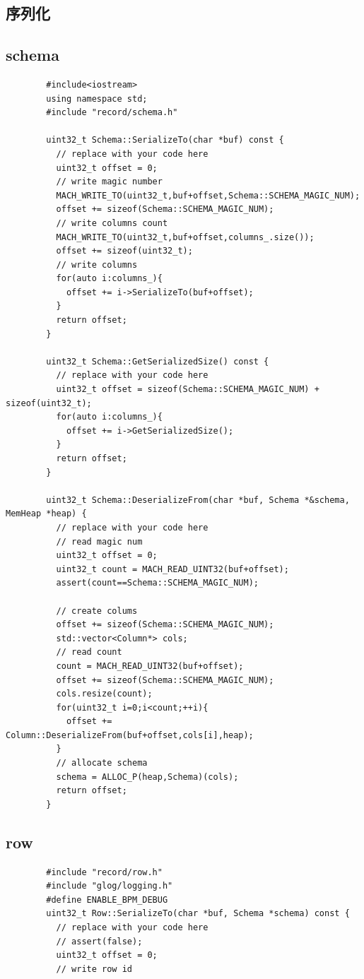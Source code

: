\documentclass{article}
\begin{document}
\begin{appendices}
    \section[A]{序列化}
    \subsection[1]{schema}
    \begin{lstlisting}
        #include<iostream>
        using namespace std;
        #include "record/schema.h"

        uint32_t Schema::SerializeTo(char *buf) const {
          // replace with your code here
          uint32_t offset = 0;
          // write magic number
          MACH_WRITE_TO(uint32_t,buf+offset,Schema::SCHEMA_MAGIC_NUM);
          offset += sizeof(Schema::SCHEMA_MAGIC_NUM);
          // write columns count
          MACH_WRITE_TO(uint32_t,buf+offset,columns_.size());
          offset += sizeof(uint32_t);
          // write columns
          for(auto i:columns_){
            offset += i->SerializeTo(buf+offset);
          }
          return offset;
        }
        
        uint32_t Schema::GetSerializedSize() const {
          // replace with your code here
          uint32_t offset = sizeof(Schema::SCHEMA_MAGIC_NUM) + sizeof(uint32_t);
          for(auto i:columns_){
            offset += i->GetSerializedSize();
          }
          return offset;
        }
        
        uint32_t Schema::DeserializeFrom(char *buf, Schema *&schema, MemHeap *heap) {
          // replace with your code here
          // read magic num
          uint32_t offset = 0;
          uint32_t count = MACH_READ_UINT32(buf+offset);
          assert(count==Schema::SCHEMA_MAGIC_NUM);
        
          // create colums
          offset += sizeof(Schema::SCHEMA_MAGIC_NUM);
          std::vector<Column*> cols;
          // read count
          count = MACH_READ_UINT32(buf+offset);
          offset += sizeof(Schema::SCHEMA_MAGIC_NUM);
          cols.resize(count);
          for(uint32_t i=0;i<count;++i){
            offset += Column::DeserializeFrom(buf+offset,cols[i],heap);
          }
          // allocate schema
          schema = ALLOC_P(heap,Schema)(cols);
          return offset;
        }
        \end{lstlisting}
    \subsection[2]{row}
    \begin{lstlisting}
        #include "record/row.h"
        #include "glog/logging.h"
        #define ENABLE_BPM_DEBUG
        uint32_t Row::SerializeTo(char *buf, Schema *schema) const {
          // replace with your code here
          // assert(false);
          uint32_t offset = 0;
          // write row id
        

\end{lstlisting}
\end{appendices}
\end{document}
